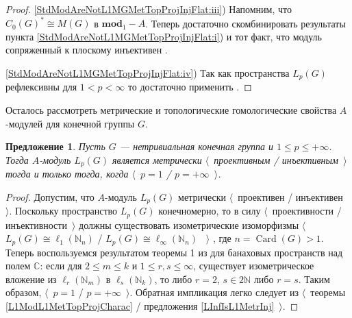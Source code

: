 \documentclass{article}
\numberwithin{equation}{section}
\theoremstyle{plain}
\newtheorem{propos}{Предложение}
\theoremstyle{definition}
\newtheorem{proof}{Доказательство}\def\theproof{}
\newcommand{\isom}{\mathop{\mathbin{\cong}}}
\begin{document}
\begin{fulltext}
\begin{proof}
\ref{StdModAreNotL1MGMetTopProjInjFlat:iii}) Напомним, что 
$C_0(G)^*\isom M(G)$ в $\mathbf{mod}_1-A$. Теперь достаточно 
скомбинировать результаты пункта 
\ref{StdModAreNotL1MGMetTopProjInjFlat:i}) и тот факт, что 
модуль сопряженный к плоскому инъективен 
\cite[предложение~2.21]{NemGeomProjInjFlatBanMod}.

\ref{StdModAreNotL1MGMetTopProjInjFlat:iv}) Так как пространства 
$L_p(G)$ рефлексивны для $1<p<\infty$ то достаточно применить 
\cite[следствие~3.14]{NemGeomProjInjFlatBanMod}.
\end{proof}

Осталось рассмотреть метрические и топологические гомологические 
свойства $A$-модулей для конечной группы $G$.

\begin{propos}\label{LpFinGrL1MGMetrInjProjCharac} Пусть $G$ --- 
нетривиальная конечная группа и $1\leq p\leq +\infty$. Тогда $A$-модуль 
$L_p(G)$ является метрически 
$\langle$~проективным / инъективным~$\rangle$ тогда и только тогда, 
когда $\langle$~$p=1$ / $p=+\infty$~$\rangle$.
\end{propos}
\begin{proof} 
Допустим, что $A$-модуль $L_p(G)$ метрически 
$\langle$~проективен / инъективен~$\rangle$. Поскольку пространство 
$L_p(G)$ конечномерно, то в силу 
$\langle$~проективности / инъективности~$\rangle$ должны существовать 
изометрические изоморфизмы 
$\langle$~$L_p(G)\isom \ell_1(\mathbb{N}_n)$ / 
$L_p(G)\isom \ell_\infty(\mathbb{N}_n)$ ~$\rangle$ 
\cite[предложение~3.8, пункты~\textup{(i)}, \textup{(ii)}]{NemGeomProjInjFlatBanMod}, 
где $n=\operatorname{Card}(G)>1$. Теперь воспользуемся результатом 
теоремы 1 из \cite{LyubIsomEmdbFinDimLp} для банаховых пространств над 
полем $\mathbb{C}$: если для $2\leq m\leq k$ и $1\leq r,s\leq \infty$, 
существует изометрическое вложение из $\ell_r(\mathbb{N}_m)$ в 
$\ell_s(\mathbb{N}_k)$, то либо $r=2$, $s\in 2\mathbb{N}$ либо $r=s$. 
Таким образом, $\langle$~$p=1$ / $p=+\infty$~$\rangle$. Обратная импликация 
легко следует из $\langle$~теоремы \ref{L1ModL1MetTopProjCharac} / 
предложения \ref{LInfIsL1MetrInj}~$\rangle$.
\end{proof}


\end{fulltext}
\end{document}
